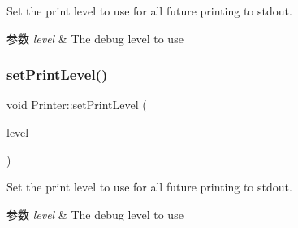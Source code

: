 Set the print level to use for all future printing to stdout. 


\begin{DoxyParams}{参数}
{\em level} & The debug level to use \\
\hline
\end{DoxyParams}
\mbox{\label{classov__core_1_1Printer_a3edd554248a7e269f4c1d0d3f84a257b}} 
\subsubsection{\texorpdfstring{set\+Print\+Level()}{setPrintLevel()}\hspace{0.1cm}{\footnotesize\ttfamily [2/2]}}
{\footnotesize\ttfamily void Printer\+::set\+Print\+Level (\begin{DoxyParamCaption}\item[{\hyperlink{classov__core_1_1Printer_a1c4c6c612ec6251afd91a1ddf933a0b2}{Print\+Level}}]{level }\end{DoxyParamCaption})\hspace{0.3cm}{\ttfamily [static]}}



Set the print level to use for all future printing to stdout. 


\begin{DoxyParams}{参数}
{\em level} & The debug level to use \\
\hline
\end{DoxyParams}
